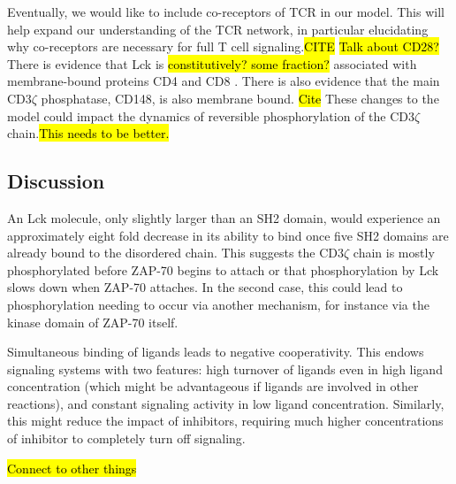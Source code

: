 \documentclass[../../AdvancementSummary.tex]{subfiles}
\begin{document}
Eventually, we would like to include co-receptors of TCR in our model. This will help expand our understanding of the TCR network, in particular elucidating why co-receptors are necessary for full T cell signaling.\hl{CITE} \hl{Talk about CD28?} There is evidence that Lck is \hl{constitutively? some fraction?} associated with membrane-bound proteins CD4 and CD8 \cite{Barber1989}. There is also evidence that the main CD3$\zeta$ phosphatase, CD148, is also membrane bound. \hl{Cite} These changes to the model could impact the dynamics of reversible phosphorylation of the CD3$\zeta$ chain.\hl{This needs to be better.}




\subsection{Discussion}

An Lck molecule, only slightly larger than an SH2 domain, would experience an approximately eight fold decrease in its ability to bind once five SH2 domains are already bound to the disordered chain. This suggests the CD3$\zeta$ chain is mostly phosphorylated before ZAP-70 begins to attach or that phosphorylation by Lck slows down when ZAP-70 attaches.  In the second case, this could lead to phosphorylation needing to occur via another mechanism, for instance via the kinase domain of ZAP-70 itself.  

Simultaneous binding of ligands leads to negative cooperativity. This endows signaling systems with two features: high turnover of ligands even in high ligand concentration (which might be advantageous if ligands are involved in other reactions), and constant signaling activity in low ligand concentration. Similarly, this might reduce the impact of inhibitors, requiring much higher concentrations of inhibitor to completely turn off signaling.

\hl{Connect to other things}



\end{document}
